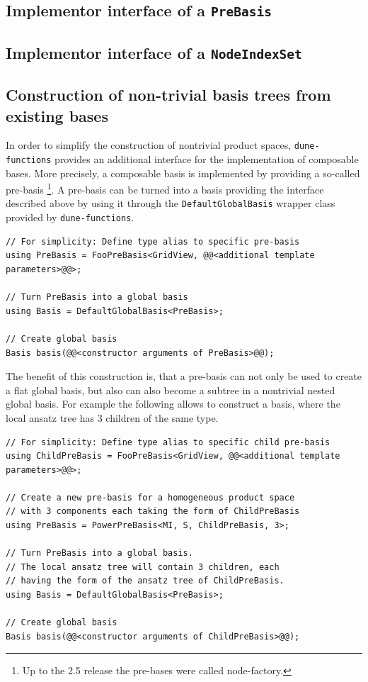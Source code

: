 \documentclass[a4paper,10pt,headings=normal,bibliography=totoc]{scrartcl}
\newcommand{\cpp}[1]{\lstinline[basicstyle=\ttfamily]!#1!}
\newcommand{\dunemodule}[1]{\texttt{#1}}
\begin{document}
\subsection{Implementor interface of a \texorpdfstring{\cpp{PreBasis}}{PreBasis}}
\subsection{Implementor interface of a \texorpdfstring{\cpp{NodeIndexSet}}{NodeIndexSet}}

\subsection{Construction of non-trivial basis trees from existing bases}
In order to simplify the construction of nontrivial product spaces,
\dunemodule{dune-functions} provides an additional interface for the
implementation of composable bases. More precisely, a composable
basis is implemented by providing a so-called pre-basis
\footnote{Up to the 2.5 release the pre-bases were called node-factory.}.
A pre-basis can be
turned into a basis providing the interface described above by
using it through the \cpp{DefaultGlobalBasis} wrapper class
provided by \dunemodule{dune-functions}.

\begin{lstlisting}[style=Example]
// For simplicity: Define type alias to specific pre-basis
using PreBasis = FooPreBasis<GridView, @@<additional template parameters>@@>;

// Turn PreBasis into a global basis
using Basis = DefaultGlobalBasis<PreBasis>;

// Create global basis
Basis basis(@@<constructor arguments of PreBasis>@@);
\end{lstlisting}

The benefit of this construction is, that a pre-basis can not
only be used to create a flat global basis, but also can also
become a subtree in a nontrivial nested global basis. For example
the following allows to construct a basis, where the local ansatz
tree has 3 children of the same type.

\begin{lstlisting}[style=Example]
// For simplicity: Define type alias to specific child pre-basis
using ChildPreBasis = FooPreBasis<GridView, @@<additional template parameters>@@>;

// Create a new pre-basis for a homogeneous product space
// with 3 components each taking the form of ChildPreBasis
using PreBasis = PowerPreBasis<MI, S, ChildPreBasis, 3>;

// Turn PreBasis into a global basis.
// The local ansatz tree will contain 3 children, each
// having the form of the ansatz tree of ChildPreBasis.
using Basis = DefaultGlobalBasis<PreBasis>;

// Create global basis
Basis basis(@@<constructor arguments of ChildPreBasis>@@);
\end{lstlisting}
\end{document}
